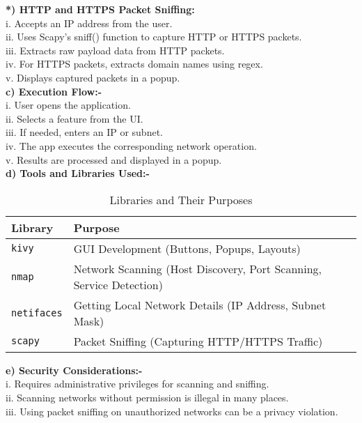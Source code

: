 \documentclass[conference]{IEEEtran}
\begin{document}
\textbf{*) HTTP and HTTPS Packet Sniffing:}\\
i. Accepts an IP address from the user.\\
ii. Uses Scapy's sniff() function to capture HTTP or HTTPS packets.\\
iii. Extracts raw payload data from HTTP packets.\\
iv. For HTTPS packets, extracts domain names using regex.\\
v. Displays captured packets in a popup.\\

\textbf{c) Execution Flow:-}\\
i. User opens the application.\\
ii. Selects a feature from the UI.\\
iii. If needed, enters an IP or subnet.\\
iv. The app executes the corresponding network operation.\\
v. Results are processed and displayed in a popup.\\

\textbf{d) Tools and Libraries Used:-}\\
\begin{table}[h]
    \centering
    \begin{tabular}{|l|p{6cm}|} %
        \hline
        \textbf{Library} & \textbf{Purpose} \\
        \hline
        \texttt{kivy} & GUI Development (Buttons, Popups, Layouts) \\
        \hline
        \texttt{nmap} & Network Scanning (Host Discovery, Port Scanning, Service Detection) \\
        \hline
        \texttt{netifaces} & Getting Local Network Details (IP Address, Subnet Mask) \\
        \hline
        \texttt{scapy} & Packet Sniffing (Capturing HTTP/HTTPS Traffic) \\
        \hline
    \end{tabular}
    \caption{Libraries and Their Purposes}
    \label{tab:libraries} 
\end{table}

\textbf{e) Security Considerations:-}\\
i. Requires administrative privileges for scanning and sniffing.\\
ii. Scanning networks without permission is illegal in many places.\\
iii. Using packet sniffing on unauthorized networks can be a privacy violation.\\
\end{document}
